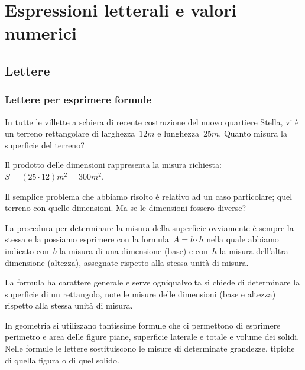 \chapter{Espressioni letterali e valori numerici}
\section{Lettere}
\subsection{Lettere per esprimere formule}
\begin{exrig}
 \begin{esempio}
 In tutte le villette a schiera di recente costruzione del nuovo quartiere Stella, vi è un
terreno rettangolare di larghezza~$12\unit{m}$ e lunghezza~$25\unit{m}$. Quanto misura la superficie del terreno?
\begin{center}
 
\end{center}

Il prodotto delle dimensioni rappresenta la misura richiesta:~$S=(25\cdot 12)\unit{m}^{2}=300\unit{m}^2$.
 \end{esempio}
\end{exrig}

Il semplice problema che abbiamo risolto è relativo ad un caso particolare; quel terreno con
quelle dimensioni. Ma se le dimensioni fossero diverse?

La procedura per determinare la misura della superficie ovviamente è sempre la stessa e la possiamo esprimere con la
formula~$A=b\cdot h$ nella quale abbiamo indicato con~$b$ la misura di una dimensione (base) e con~$h$ la misura dell'altra
dimensione (altezza), assegnate rispetto alla stessa unità di misura.

\osservazione La formula ha carattere generale e serve ogniqualvolta si chiede di determinare la superficie di un rettangolo,
note le misure delle dimensioni (base e altezza) rispetto alla stessa unità di misura.

In geometria si utilizzano tantissime formule che ci permettono di esprimere perimetro e
area delle figure piane, superficie laterale e totale e volume dei solidi. Nelle formule le lettere sostituiscono le
misure di determinate grandezze, tipiche di quella figura o di quel solido.

\ovalbox{\risolvi \ref{ese:9.1}}

